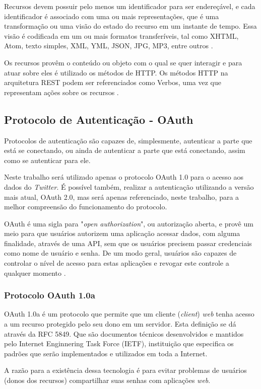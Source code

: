 Recursos devem possuir pelo menos um identificador para ser endereçável, e cada identificador é associado com uma ou mais representações, que é uma transformação ou uma visão do estado do recurso em um instante de tempo. Essa visão é codificada em um ou mais formatos transferíveis, tal como XHTML, Atom, texto simples, XML, YML, JSON, JPG, MP3, entre outros  \cite{rest-book}.

Os recursos provêm o conteúdo ou objeto com o qual se quer interagir e para atuar sobre eles é utilizado os métodos de HTTP. Os métodos HTTP na arquitetura REST podem ser referenciados como Verbos, uma vez que representam ações sobre os recursos \cite{rest-book}.


\subsection{Protocolo de Autenticação - OAuth}
Protocolos de autenticação são capazes de, simplesmente, autenticar a parte que está se conectando, ou ainda de autenticar a parte que está conectando, assim como se autenticar para ele.

Neste trabalho será utilizado apenas o protocolo OAuth 1.0 para o acesso aos dados do \textit{Twitter}. É possível também, realizar a autenticação utilizando a versão mais atual, OAuth 2.0, mas será apenas referenciado, neste trabalho, para a melhor compreensão do funcionamento do protocolo.

OAuth é uma sigla para "\textit{open authorization}", ou autorização aberta, e provê um meio para que usuários autorizem uma aplicação acessar dados, com alguma finalidade, através de uma API, sem que os usuários precisem passar credenciais como nome de usuário e senha. De um modo geral, usuários são capazes de controlar o nível de acesso para estas aplicações e revogar este controle a qualquer momento \cite{mining-social-web}.

\subsubsection{Protocolo OAuth 1.0a}
OAuth 1.0a é um protocolo que permite que um cliente (\textit{client}) \textit{web} tenha acesso a um recurso protegido pelo seu dono em um servidor. Esta definição se dá através da RFC 5849. Que são documentos técnicos desenvolvidos e mantidos pelo Internet Enginnering Task Force (IETF), instituição que especifica os padrões que serão implementados e utilizados em toda a Internet.

A razão para a existência dessa tecnologia é para evitar problemas de usuários (donos dos recursos) compartilhar suas senhas com aplicações \textit{web}.

